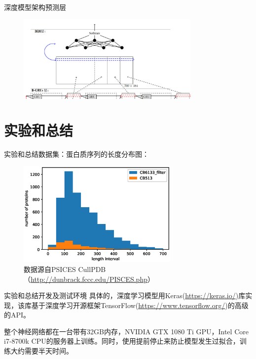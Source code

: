 \documentclass[table]{beamer}
\begin{document}
\begin{frame}{深度模型架构}{预测层}
\begin{figure}
	\centering
	\includegraphics[width=0.8\textwidth]{pic/pptlayer3}
\end{figure}

\end{frame}


\section{实验和总结}
\begin{frame}{实验和总结}{数据集：蛋白质序列的长度分布图：}
\begin{figure}
	\centering
	\includegraphics[width=0.7\textwidth]{pic/data_hist}
	\caption{数据源自PSICES CullPDB（\url{http://dunbrack.fccc.edu/PISCES.php}）}
\end{figure}
\end{frame}

\begin{frame}{实验和总结}{开发及测试环境}
具体的，深度学习模型用Keras(\url{https://keras.io/})库实现，该库基于深度学习开源框架TensorFlow(\url{https://www.tensorflow.org/})的高级的API。

整个神经网络都在一台带有32GB内存，NVIDIA GTX 1080 Ti GPU，Intel Core i7-8700k CPU的服务器上训练。同时，使用提前停止来防止模型发生过拟合，训练大约需要半天时间。
\end{frame}
\end{document}
